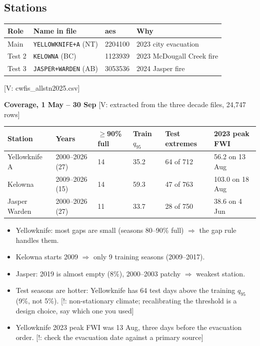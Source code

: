 \documentclass[11pt,a4paper]{article}
\newcommand{\tagbox}[2]{{\footnotesize\color{#1}\textsf{[#2]}}}
\newcommand{\veri}[1]{\tagbox{ForestGreen!70!black}{V: #1}}  %
\newcommand{\caut}[1]{\tagbox{BrickRed}{!: #1}}               %
\newcommand{\code}[1]{\texttt{\small #1}}
\begin{document}
\subsection{Stations}
\begin{center}\small
\begin{tabularx}{\linewidth}{@{}l l l Y@{}}
\toprule
\textbf{Role} & \textbf{Name in file} & \textbf{aes} & \textbf{Why}\\
\midrule
Main & \code{YELLOWKNIFE+A} (NT) & 2204100 & 2023 city evacuation\\
Test 2 & \code{KELOWNA} (BC) & 1123939 & 2023 McDougall Creek fire\\
Test 3 & \code{JASPER+WARDEN} (AB) & 3053536 & 2024 Jasper fire\\
\bottomrule
\end{tabularx}
\end{center}
\veri{cwfis\_allstn2025.csv}

\textbf{Coverage, 1 May -- 30 Sep} \veri{extracted from the three decade files, 24{,}747 rows}
\begin{center}\small
\begin{tabularx}{\linewidth}{@{}l l l l l Y@{}}
\toprule
\textbf{Station} & \textbf{Years} & \textbf{$\ge$90\% full} & \textbf{Train $q_{95}$} & \textbf{Test extremes} & \textbf{2023 peak FWI}\\
\midrule
Yellowknife A & 2000--2026 (27) & 14 & 35.2 & 64 of 712 & 56.2 on 13 Aug\\
Kelowna & 2009--2026 (15) & 14 & 59.3 & 47 of 763 & 103.0 on 18 Aug\\
Jasper Warden & 2000--2026 (27) & 11 & 33.7 & 28 of 750 & 38.6 on 4 Jun\\
\bottomrule
\end{tabularx}
\end{center}
\begin{itemize}
\item Yellowknife: most gaps are small (seasons 80--90\% full) $\Rightarrow$ the gap rule handles them.
\item Kelowna starts 2009 $\Rightarrow$ only 9 training seasons (2009--2017).
\item Jasper: 2019 is almost empty (8\%), 2000--2003 patchy $\Rightarrow$ weakest station.
\item Test seasons are hotter: Yellowknife has 64 test days above the training $q_{95}$ (9\%, not 5\%).
  \caut{non-stationary climate; recalibrating the threshold is a design choice, say which one you used}
\item Yellowknife 2023 peak FWI was 13 Aug, three days before the evacuation order. \caut{check the evacuation date
  against a primary source}
\end{itemize}
\end{document}
